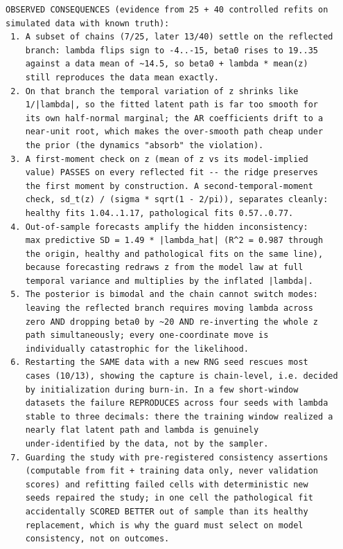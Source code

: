 \documentclass[11pt]{article}
\begin{document}
{\begin{verbatim}
OBSERVED CONSEQUENCES (evidence from 25 + 40 controlled refits on
simulated data with known truth):
 1. A subset of chains (7/25, later 13/40) settle on the reflected
    branch: lambda flips sign to -4..-15, beta0 rises to 19..35
    against a data mean of ~14.5, so beta0 + lambda * mean(z)
    still reproduces the data mean exactly.
 2. On that branch the temporal variation of z shrinks like
    1/|lambda|, so the fitted latent path is far too smooth for
    its own half-normal marginal; the AR coefficients drift to a
    near-unit root, which makes the over-smooth path cheap under
    the prior (the dynamics "absorb" the violation).
 3. A first-moment check on z (mean of z vs its model-implied
    value) PASSES on every reflected fit -- the ridge preserves
    the first moment by construction. A second-temporal-moment
    check, sd_t(z) / (sigma * sqrt(1 - 2/pi)), separates cleanly:
    healthy fits 1.04..1.17, pathological fits 0.57..0.77.
 4. Out-of-sample forecasts amplify the hidden inconsistency:
    max predictive SD = 1.49 * |lambda_hat| (R^2 = 0.987 through
    the origin, healthy and pathological fits on the same line),
    because forecasting redraws z from the model law at full
    temporal variance and multiplies by the inflated |lambda|.
 5. The posterior is bimodal and the chain cannot switch modes:
    leaving the reflected branch requires moving lambda across
    zero AND dropping beta0 by ~20 AND re-inverting the whole z
    path simultaneously; every one-coordinate move is
    individually catastrophic for the likelihood.
 6. Restarting the SAME data with a new RNG seed rescues most
    cases (10/13), showing the capture is chain-level, i.e. decided
    by initialization during burn-in. In a few short-window
    datasets the failure REPRODUCES across four seeds with lambda
    stable to three decimals: there the training window realized a
    nearly flat latent path and lambda is genuinely
    under-identified by the data, not by the sampler.
 7. Guarding the study with pre-registered consistency assertions
    (computable from fit + training data only, never validation
    scores) and refitting failed cells with deterministic new
    seeds repaired the study; in one cell the pathological fit
    accidentally SCORED BETTER out of sample than its healthy
    replacement, which is why the guard must select on model
    consistency, not on outcomes.


\end{verbatim}}
\end{document}
